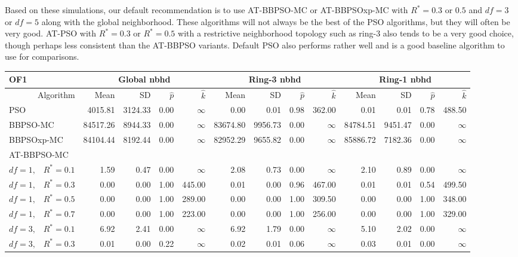 \documentclass[cmbright]{staauth}
\begin{document}
Based on these simulations, our default recommendation is to use AT-BBPSO-MC or AT-BBPSOxp-MC with $R^*=0.3$ or $0.5$ and $df=3$ or $df=5$ along with the global neighborhood. These algorithms will not always be the best of the PSO algorithms, but they will often be very good. AT-PSO with $R^*=0.3$ or $R^*=0.5$ with a restrictive neighborhood topology such as ring-3 also tends to be a very good choice, though perhaps less consistent than the AT-BBPSO variants. Default PSO also performs rather well and is a good baseline algorithm to use for comparisons.


\begin{table}[ht]
\centering
\tiny{
\begin{tabular}{r|rrrr|rrrr|rrrr}
\multicolumn{1}{l}{OF1} & \multicolumn{4}{c}{Global nbhd} & \multicolumn{4}{c}{Ring-3 nbhd} & \multicolumn{4}{c}{Ring-1 nbhd}\\
\hline
Algorithm & Mean & SD & $\widehat{p}$ & $\widehat{k}$ & Mean & SD & $\widehat{p}$ & $\widehat{k}$ & Mean & SD & $\widehat{p}$ & $\widehat{k}$ \\
  \hline
\multicolumn{1}{l|}{PSO} & 4015.81 & 3124.33 & 0.00 & $\infty$ & 0.00 & 0.01 & 0.98 & 362.00 & 0.01 & 0.01 & 0.78 & 488.50 \\
  \multicolumn{1}{l|}{BBPSO-MC} & 84517.26 & 8944.33 & 0.00 & $\infty$ & 83674.80 & 9956.73 & 0.00 & $\infty$ & 84784.51 & 9451.47 & 0.00 & $\infty$ \\
  \multicolumn{1}{l|}{BBPSOxp-MC} & 84104.44 & 8192.44 & 0.00 & $\infty$ & 82952.29 & 9655.82 & 0.00 & $\infty$ & 85886.72 & 7182.36 & 0.00 & $\infty$ \\
\hline
\multicolumn{1}{l|}{AT-BBPSO-MC} &&&&&&&&&&&&\\
  $df = 1,\enspace$ $R^* =0.1$ & 1.59 & 0.47 & 0.00 & $\infty$ & 2.08 & 0.73 & 0.00 & $\infty$ & 2.10 & 0.89 & 0.00 & $\infty$ \\
  $df = 1,\enspace$ $R^* =0.3$ & 0.00 & 0.00 & 1.00 & 445.00 & 0.01 & 0.00 & 0.96 & 467.00 & 0.01 & 0.01 & 0.54 & 499.50 \\
  $df = 1,\enspace$ $R^* =0.5$ & 0.00 & 0.00 & 1.00 & 289.00 & 0.00 & 0.00 & 1.00 & 309.50 & 0.00 & 0.00 & 1.00 & 348.00 \\
  $df = 1,\enspace$ $R^* =0.7$ & 0.00 & 0.00 & 1.00 & 223.00 & 0.00 & 0.00 & 1.00 & 256.00 & 0.00 & 0.00 & 1.00 & 329.00 \\
  $df = 3,\enspace$ $R^* =0.1$ & 6.92 & 2.41 & 0.00 & $\infty$ & 6.92 & 1.79 & 0.00 & $\infty$ & 5.10 & 2.02 & 0.00 & $\infty$ \\
  $df = 3,\enspace$ $R^* =0.3$ & 0.01 & 0.00 & 0.22 & $\infty$ & 0.02 & 0.01 & 0.06 & $\infty$ & 0.03 & 0.01 & 0.00 & $\infty$ \\

\end{tabular}}
\end{table}
\end{document}
